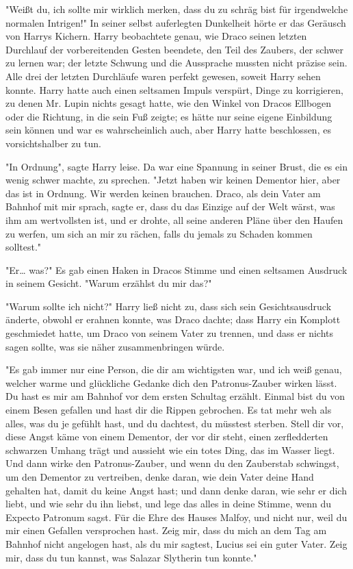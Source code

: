 {"Weißt du, ich sollte mir wirklich merken, dass du zu schräg bist für irgendwelche normalen Intrigen!" In seiner selbst auferlegten Dunkelheit hörte er das Geräusch von Harrys Kichern. Harry beobachtete genau, wie Draco seinen letzten Durchlauf der vorbereitenden Gesten beendete, den Teil des Zaubers, der schwer zu lernen war; der letzte Schwung und die Aussprache mussten nicht präzise sein. Alle drei der letzten Durchläufe waren perfekt gewesen, soweit Harry sehen konnte. Harry hatte auch einen seltsamen Impuls verspürt, Dinge zu korrigieren, zu denen Mr. Lupin nichts gesagt hatte, wie den Winkel von Dracos Ellbogen oder die Richtung, in die sein Fuß zeigte; es hätte nur seine eigene Einbildung sein können und war es wahrscheinlich auch, aber Harry hatte beschlossen, es vorsichtshalber zu tun.

"In Ordnung", sagte Harry leise. Da war eine Spannung in seiner Brust, die es ein wenig schwer machte, zu sprechen. "Jetzt haben wir keinen Dementor hier, aber das ist in Ordnung. Wir werden keinen brauchen. Draco, als dein Vater am Bahnhof mit mir sprach, sagte er, dass du das Einzige auf der Welt wärst, was ihm am wertvollsten ist, und er drohte, all seine anderen Pläne über den Haufen zu werfen, um sich an mir zu rächen, falls du jemals zu Schaden kommen solltest."

"Er… was?" Es gab einen Haken in Dracos Stimme und einen seltsamen Ausdruck in seinem Gesicht. "Warum erzählst du mir das?"

"Warum sollte ich nicht?" Harry ließ nicht zu, dass sich sein Gesichtsausdruck änderte, obwohl er erahnen konnte, was Draco dachte; dass Harry ein Komplott geschmiedet hatte, um Draco von seinem Vater zu trennen, und dass er nichts sagen sollte, was sie näher zusammenbringen würde.

"Es gab immer nur eine Person, die dir am wichtigsten war, und ich weiß genau, welcher warme und glückliche Gedanke dich den Patronus-Zauber wirken lässt. Du hast es mir am Bahnhof vor dem ersten Schultag erzählt. Einmal bist du von einem Besen gefallen und hast dir die Rippen gebrochen. Es tat mehr weh als alles, was du je gefühlt hast, und du dachtest, du müsstest sterben. Stell dir vor, diese Angst käme von einem Dementor, der vor dir steht, einen zerfledderten schwarzen Umhang trägt und aussieht wie ein totes Ding, das im Wasser liegt. Und dann wirke den Patronus-Zauber, und wenn du den Zauberstab schwingst, um den Dementor zu vertreiben, denke daran, wie dein Vater deine Hand gehalten hat, damit du keine Angst hast; und dann denke daran, wie sehr er dich liebt, und wie sehr du ihn liebst, und lege das alles in deine Stimme, wenn du Expecto Patronum sagst. Für die Ehre des Hauses Malfoy, und nicht nur, weil du mir einen Gefallen versprochen hast. Zeig mir, dass du mich an dem Tag am Bahnhof nicht angelogen hast, als du mir sagtest, Lucius sei ein guter Vater. Zeig mir, dass du tun kannst, was Salazar Slytherin tun konnte."

}

